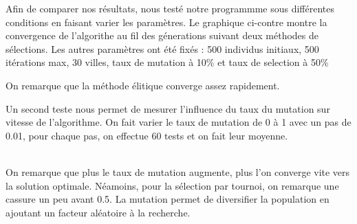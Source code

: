 \documentclass{article}
\begin{document}
    Afin de comparer nos résultats, nous testé notre programmme sous différentes conditions en faisant varier les paramètres.
    Le graphique ci-contre montre la convergence de l'algorithe au fil des génerations suivant deux méthodes de sélections.
    Les autres paramètres ont été fixés : 500 individus initiaux, 500 itérations max, 30 villes, taux de mutation à 10\% et taux de selection à 50\%
	\begin{figure}[!h]
		\begin{center}
		\end{center}
	\end{figure}

	On remarque que la méthode élitique converge assez rapidement.

	Un second teste nous permet de mesurer l'influence du taux du mutation sur vitesse de l'algorithme. On fait varier le taux de mutation de 0 à 1 avec un pas de 0.01, pour chaque pas, on effectue 60 tests et on fait leur moyenne.
    \begin{figure}[!h]
        \begin{center}
        \end{center}
    \end{figure}
    \\
    On remarque que plus le taux de mutation augmente, plus l'on converge vite vers la solution optimale. Néamoins, pour la sélection par tournoi, on remarque une cassure un peu avant 0.5.
    La mutation permet de diversifier la population en ajoutant un facteur aléatoire à la recherche.
\end{document}
